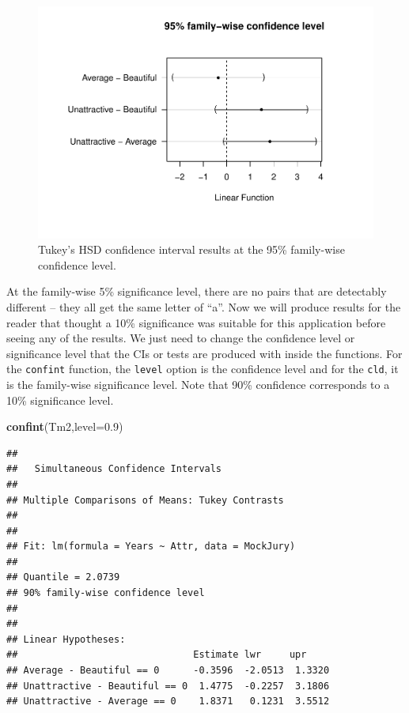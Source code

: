 \documentclass[]{book}
\newenvironment{Shaded}{\begin{snugshade}}{\end{snugshade}}
\newcommand{\KeywordTok}[1]{\textcolor[rgb]{0.13,0.29,0.53}{\textbf{#1}}}
\newcommand{\DataTypeTok}[1]{\textcolor[rgb]{0.13,0.29,0.53}{#1}}
\newcommand{\FloatTok}[1]{\textcolor[rgb]{0.00,0.00,0.81}{#1}}
\newcommand{\NormalTok}[1]{#1}
\theoremstyle{definition}
\theoremstyle{definition}
\theoremstyle{remark}
\begin{document}
\begin{figure}
\centering
\includegraphics{03-oneWayAnova_files/figure-latex/Figure3-21-1.pdf}
\caption{\label{fig:Figure3-21}Tukey's HSD confidence interval results at the 95\%
family-wise confidence level.}
\end{figure}

At the family-wise 5\% significance level, there are no pairs that are
detectably different -- they all get the same letter of ``a''. Now we
will produce results for the reader that thought a 10\% significance was
suitable for this application before seeing any of the results. We just
need to change the confidence level or significance level that the CIs
or tests are produced with inside the functions. For the
\texttt{confint} function, the \texttt{level} option is the confidence
level and for the \texttt{cld}, it is the family-wise significance
level. Note that 90\% confidence corresponds to a 10\% significance
level.



\begin{Shaded}
\begin{Highlighting}[]
\KeywordTok{confint}\NormalTok{(Tm2,}\DataTypeTok{level=}\FloatTok{0.9}\NormalTok{)}
\end{Highlighting}
\end{Shaded}

\begin{verbatim}
## 
##   Simultaneous Confidence Intervals
## 
## Multiple Comparisons of Means: Tukey Contrasts
## 
## 
## Fit: lm(formula = Years ~ Attr, data = MockJury)
## 
## Quantile = 2.0739
## 90% family-wise confidence level
##  
## 
## Linear Hypotheses:
##                               Estimate lwr     upr    
## Average - Beautiful == 0      -0.3596  -2.0513  1.3320
## Unattractive - Beautiful == 0  1.4775  -0.2257  3.1806
## Unattractive - Average == 0    1.8371   0.1231  3.5512
\end{verbatim}
\end{document}
